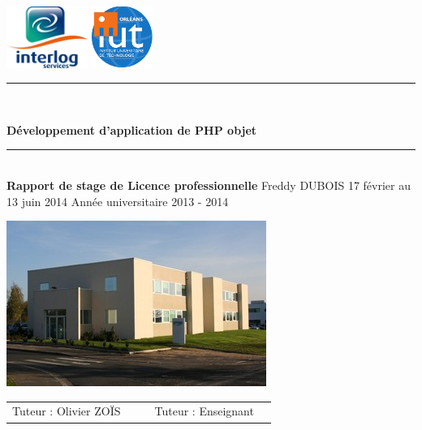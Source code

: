 \documentclass[11pt,openright,a4paper]{report}
\begin{document}
	\begin{titlepage}
		\begin{Large}
		\baselineskip=7mm
		\noindent
			\includegraphics[height=2cm]{./images/logo}
			\hfill
			\includegraphics[height=2cm]{./images/logo_IUT}
			\vskip 30mm
			\begin{center}
				\rule{\textwidth}{1 mm}\\
				{\huge\sffamily\bfseries\baselineskip=1cm
					Développement d'application de PHP objet
				\par}
				\rule{\textwidth}{1 mm}\\
				{\Large\sffamily\bfseries 
					Rapport de stage de Licence professionnelle
				}
					\vskip 20mm
				Freddy DUBOIS
					\vskip 5mm
				17 février au 13 juin 2014
					\vskip 5mm
				Année universitaire 2013 - 2014
					\vfill
					\begin{photo}[!h]
						\centering
						\includegraphics[scale=1]{./images/siege_interlog}
					\end{photo}
					\vskip 5mm %
				\begin{tabular}{l l p{4cm} l l}
					 Tuteur : Olivier ZOÏS		&	&	&	Tuteur : Enseignant	
				\end{tabular}
			\end{center}
		\end{Large}
	\end{titlepage}



\cleardoublepage
\sloppy %

\tableofcontents			%






%

\end{document}
